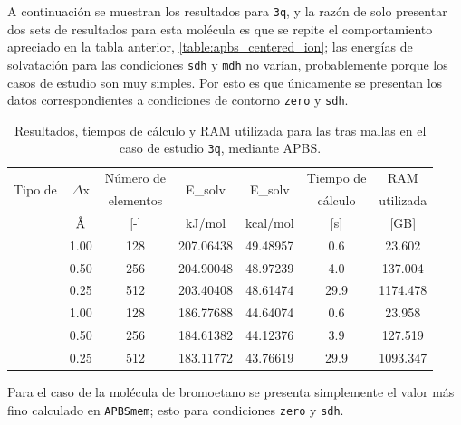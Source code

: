 \documentclass[12pt, twoside, onehalfspace, numbers, spanish]{ezthesis}
\numberwithin{equation}{section}
\newcommand{\angstrom}{\text{\normalfont\AA}}
\begin{document}
\noindent
A continuación se muestran los resultados para \texttt{3q}, y la razón de solo presentar dos sets de resultados para esta molécula es que se repite el comportamiento apreciado en la tabla anterior, \ref{table:apbs_centered_ion}; las energías de solvatación para las condiciones \texttt{sdh} y \texttt{mdh} no varían, probablemente porque los casos de estudio son muy simples. Por esto es que únicamente se presentan los datos correspondientes a condiciones de contorno \texttt{zero} y \texttt{sdh}.
\begin{table}[h]
	\centering
	\caption{Resultados, tiempos de cálculo y RAM utilizada para las tras mallas en el caso de estudio \texttt{3q}, mediante APBS.}
	\def\arraystretch{1.2}
	\begin{tabular}{|c|cccccc|}\hline
		\multirow{2}{*}{Tipo de} & \multirow{2}{*}{$\Delta$x} & Número de & \multirow{2}{*}{E\_solv} & \multirow{2}{*}{E\_solv} & Tiempo de & RAM\\
		\multirow{2}{*}{condición} &  & elementos &  &  & cálculo & utilizada\\\cline{2-7}
		&  $\angstrom$ & [-] & kJ/mol & kcal/mol & [s] & [GB] \\\hline
		\parbox[t]{2mm}{} & 1.00 & 128 & 207.06438 & 49.48957 & 0.6 & 23.602 \\
		& 0.50 & 256 & 204.90048 & 48.97239 & 4.0 & 137.004 \\
		& 0.25 & 512 & 203.40408 & 48.61474 & 29.9 & 1174.478 \\ \hline
		\parbox[t]{2mm}{} & 1.00 & 128 & 186.77688 & 44.64074 & 0.6 & 23.958 \\
		& 0.50 & 256 & 184.61382 & 44.12376 & 3.9 & 127.519 \\
		& 0.25 & 512 & 183.11772 & 43.76619 & 29.9 & 1093.347 \\ \hline
	\end{tabular}\label{table:apbs_3q}
\end{table}

\noindent
Para el caso de la molécula de bromoetano se presenta simplemente el valor más fino calculado en \texttt{APBSmem}; esto para condiciones \texttt{zero} y \texttt{sdh}.
\end{document}
